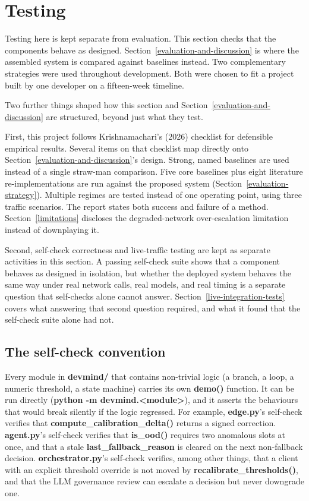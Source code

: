 \hypertarget{testing}{%
\section{Testing}\label{testing}}

Testing here is kept separate from evaluation. This section checks that
the components behave as designed. Section~\ref{evaluation-and-discussion} is where the assembled system
is compared against baselines instead. Two complementary strategies were
used throughout development. Both were chosen to fit a project built by
one developer on a fifteen-week timeline.

Two further things shaped how this section and Section~\ref{evaluation-and-discussion} are
structured, beyond just what they test.

First, this project follows Krishnamachari's (2026) checklist for
defensible empirical results. Several items on that checklist map
directly onto Section~\ref{evaluation-and-discussion}'s design. Strong, named baselines are used
instead of a single straw-man comparison. Five core baselines plus
eight literature re-implementations are run against the proposed
system (Section~\ref{evaluation-strategy}). Multiple regimes are tested instead of one
operating point, using three traffic scenarios. The report
states both success and failure of a method. Section~\ref{limitations} discloses
the degraded-network over-escalation limitation instead of
downplaying it.

Second, self-check correctness and live-traffic testing are kept as
separate activities in this section. A passing self-check
suite shows that a component behaves as designed in isolation, but
whether the deployed system behaves the same way under real network
calls, real models, and real timing is a separate question that
self-checks alone cannot answer. Section~\ref{live-integration-tests}
covers what answering that second question required, and what it found
that the self-check suite alone had not.

\hypertarget{self-check-convention}{%
\subsection{The self-check convention}\label{self-check-convention}}

Every module in \textbf{devmind/} that contains non-trivial logic (a
branch, a loop, a numeric threshold, a state machine) carries its own
\textbf{demo()} function. It can be run directly (\textbf{python -m
devmind.\textless module\textgreater}), and it asserts the behaviours
that would break silently if the logic regressed. For example,
\textbf{edge.py}'s self-check verifies that
\textbf{compute\_calibration\_delta()} returns a signed correction.
\textbf{agent.py}'s self-check verifies that
\textbf{is\_ood()} requires two anomalous slots at once, and that a stale
\textbf{last\_fallback\_reason} is cleared on the next non-fallback
decision. \textbf{orchestrator.py}'s self-check verifies, among other
things, that a client with an explicit threshold override is not moved
by \textbf{recalibrate\_thresholds()}, and that the LLM governance
review can escalate a decision but never downgrade one.

